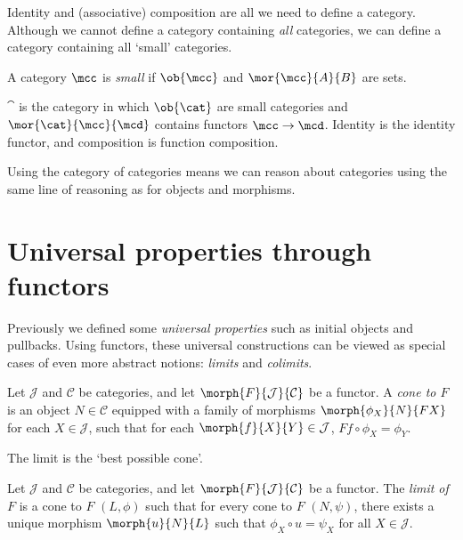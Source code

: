 Identity and (associative) composition are all we need to define a category.
Although we cannot define a category containing \emph{all} categories, we can
define a category containing all `small' categories.

\begin{definition}
    A category \(\mcc\) is \emph{small} if \(\ob{\mcc}\) and
    \(\mor{\mcc}{A}{B}\) are sets.
\end{definition}

\begin{example}
    \(\cat\) is the category in which \(\ob{\cat}\) are small categories and
    \(\mor{\cat}{\mcc}{\mcd}\) contains functors \(\mcc \to \mcd\).
    Identity is the identity functor, and composition is function composition.
\end{example}

Using the category of categories means we can reason about categories using the
same line of reasoning as for objects and morphisms.

\section{Universal properties through functors}

Previously we defined some \emph{universal properties} such as initial
objects and pullbacks.
Using functors, these universal constructions can be viewed as special cases of
even more abstract notions: \emph{limits} and \emph{colimits}.

\begin{definition}[Cone]
    Let \(\mathcal{J}\) and \(\mathcal{C}\) be categories, and let
    \(\morph{F}{\mathcal{J}}{\mathcal{C}}\) be a functor.
    A \emph{cone to \(F\)} is an object \(N \in \mathcal{C}\) equipped with
    a family of morphisms \(\morph{\phi_X}{N}{FX}\) for each
    \(X \in \mathcal{J}\), such that for each
    \(\morph{f}{X}{Y} \in \mathcal{J}\),
    \(Ff \circ \phi_X = \phi_Y\).
    \begin{center}
        
    \end{center}
\end{definition}

The limit is the `best possible cone'.

\begin{definition}[Limit]
    Let \(\mathcal{J}\) and \(\mathcal{C}\) be categories, and let
    \(\morph{F}{\mathcal{J}}{\mathcal{C}}\) be a functor.
    The \emph{limit of \(F\)} is a cone to \(F\) \((L,\phi) \) such that for
    every cone to \(F\) \((N, \psi)\), there exists a unique morphism
    \(\morph{u}{N}{L}\) such that \(\phi_X \circ u = \psi_X\) for all
    \(X \in \mathcal{J}\).
    \begin{center}
        
    \end{center}
\end{definition}

